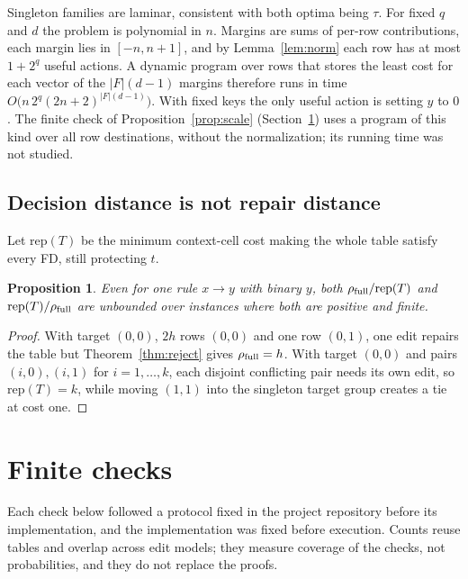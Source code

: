 \documentclass[11pt]{article}
\newtheorem{proposition}{Proposition}
\theoremstyle{remark}
\newcommand{\rfull}{\rho_{\rm full}}
\begin{document}
Singleton families are laminar, consistent with both optima being $\tau$. For
fixed $q$ and $d$ the problem is polynomial in $n$. Margins are sums of
per-row contributions, each margin lies in $[-n,n+1]$, and by
Lemma~\ref{lem:norm} each row has at most $1+2^q$ useful actions. A dynamic
program over rows that stores the least cost for each vector of the
$|F|(d-1)$ margins therefore runs in time
$O\bigl(n\,2^q(2n+2)^{|F|(d-1)}\bigr)$. With fixed keys the only useful
action is setting $y$ to $0$. The finite check of
Proposition~\ref{prop:scale} (Section~\ref{sec:checks}) uses a program of this
kind over all row destinations, without the normalization; its running time was
not studied.

\subsection{Decision distance is not repair distance}
Let $\mathrm{rep}(T)$ be the minimum context-cell cost making the whole table satisfy
every FD, still protecting $t$.
\begin{proposition}\label{prop:separation}
Even for one rule $x\to y$ with binary $y$, both $\rfull/\mathrm{rep}(T)$ and
$\mathrm{rep}(T)/\rfull$ are unbounded over instances where both are positive and finite.
\end{proposition}
\begin{proof}
With target $(0,0)$, $2h$ rows $(0,0)$ and one row $(0,1)$, one edit repairs
the table but Theorem~\ref{thm:reject} gives $\rfull=h$. With target $(0,0)$
and pairs $(i,0),(i,1)$ for $i=1,\ldots,k$, each disjoint conflicting pair needs
its own edit, so $\mathrm{rep}(T)=k$, while moving $(1,1)$ into the singleton target group
creates a tie at cost one.
\end{proof}

\section{Finite checks}\label{sec:checks}
Each check below followed a protocol fixed in the project repository before
its implementation, and the implementation was fixed before execution. Counts reuse
tables and overlap across edit models; they measure coverage of the checks,
not probabilities, and they do not replace the proofs.
\end{document}

